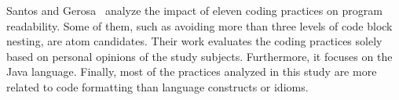 Santos and Gerosa~\cite{Santos:2018:ICP} analyze the impact of eleven coding practices on program readability. Some of them, such as avoiding more than three levels of code block nesting, are atom candidates. 
Their work evaluates the coding practices solely based on personal opinions of the study subjects. Furthermore, it focuses on the Java language. Finally, most of the practices analyzed in this study are more related to code formatting than language constructs or idioms.

